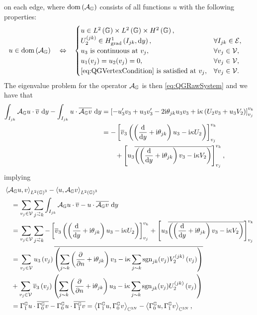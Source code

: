 on each edge, where $\mathrm{dom}\left( \mathcal{A}_{\mathbb{G}} \right)$ consists of all functions $u$ with the following properties:
\begin{align*}
	u\in\mathrm{dom}\left( \mathcal{A}_{\mathbb{G}} \right) \quad\Leftrightarrow\quad &
	\begin{cases}
	u\in L^2\left( \mathbb{G} \right)\times L^2\left( \mathbb{G} \right)\times H^2\left( \mathbb{G} \right), \\
	U_2^{(jk)}\in H^1_\mathrm{grad}\left( I_{jk}, \mathrm{d}y \right), & \forall I_{jk}\in\mathcal{E}, \\
	u_3 \text{ is continuous at } v_j, & \forall v_j\in\mathcal{V}, \\
	u_1(v_j) = u_2(v_j) = 0, & \forall v_j\in\mathcal{V}, \\
	\text{\eqref{eq:QGVertexCondition} is satisfied at } v_j, & \forall v_j\in\mathcal{V}.
	\end{cases}
\end{align*}
The eigenvalue problem for the operator $\mathcal{A}_{\mathbb{G}}$ is then \eqref{eq:QGRawSystem} and we have that
\begin{align*}
	\int_{I_{jk}} \mathcal{A}_{\mathbb{G}} u \cdot \overline{v}  \ \mathrm{d}y - \int_{I_{jk}} u \cdot \overline{\mathcal{A}_{\mathbb{G}} v}  \ \mathrm{d}y
	&= \left[  -u'_3 v_3 + u_3 v_3' - 2\mathrm{i}\theta_{jk}u_3 v_3 + \mathrm{i}\kappa\left( U_2 v_3 + u_3 V_2 \right)  \right]_{v_j}^{v_k} \\
	&= -\left[  \overline{v}_3\left(  \left( \dfrac{\mathrm{d}}{\mathrm{d}y} + \mathrm{i}\theta_{jk}  \right)u_3 - \mathrm{i}\kappa U_2  \right)  \right]_{v_j}^{v_k} \\
	&\qquad + \left[  u_3\overline{\left(  \left( \dfrac{\mathrm{d}}{\mathrm{d}y} + \mathrm{i}\theta_{jk}  \right)v_3 - \mathrm{i}\kappa V_2  \right)}  \right]_{v_j}^{v_k},
\end{align*}
implying
\begin{align*}
	&\ip{\ag u}{v}_{L^2\bracs{\graph}^3} - \ip{u}{\ag v}_{L^2\bracs{\graph}^3} \\
	&\quad = \sum_{v_j\in\vertSet}\sum_{j\conLeft k} \integral{I_{jk}}{ \ag u \cdot \overline{v} - u \cdot \overline{\ag v} }{y} \\
	&\quad = \sum_{v_j\in\vertSet}\sum_{j\conLeft k} -\sqbracs{ \overline{v}_3\bracs{ \bracs{\diff{}{y} + \rmi\qm_{jk} }u_3 - \rmi\wavenumber U_2 } }_{v_j}^{v_k}
	+ \sqbracs{ u_3\overline{\bracs{ \bracs{\diff{}{y} + \rmi\qm_{jk} }v_3 - \rmi\wavenumber V_2 }} }_{v_j}^{v_k} \\
	&\quad = \sum_{v_j\in\vertSet} u_3\bracs{v_j}\overline{\bracs{ \sum_{j\con k}\bracs{\pdiff{}{n} + \rmi\qm_{jk}}v_3 - \rmi\wavenumber\sum_{j\con k} \sgn_{jk}(v_j) V_2^{(jk)}\bracs{v_j} }} \\
	&\quad + \sum_{v_j\in\vertSet} \overline{v}_3\bracs{v_j}\bracs{ \sum_{j\con k}\bracs{\pdiff{}{n} + \rmi\qm_{jk}}u_3 - \rmi\wavenumber\sum_{j\con k} \sgn_{jk}(v_j) U_2^{(jk)}\bracs{v_j} } \\
	&\quad = \ngmap u \cdot \overline{\dgmap v} - \dgmap u \cdot \overline{\ngmap v}
	= \ip{\ngmap u}{\dgmap v}_{\complex^{3N}} - \ip{\dgmap u}{\ngmap v}_{\complex^{3N}},
\end{align*}
